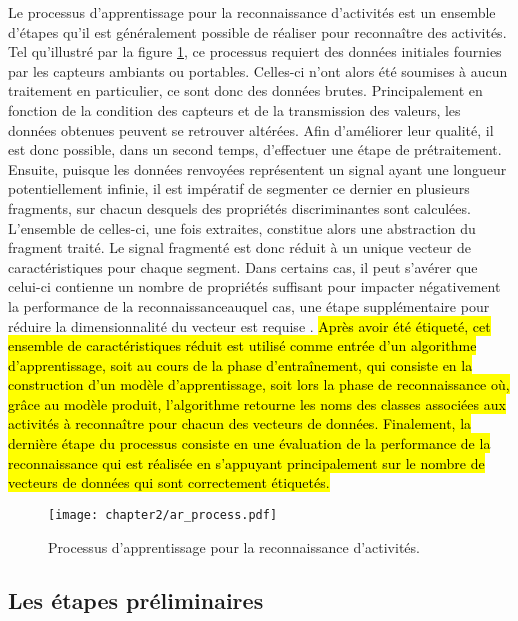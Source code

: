 Le processus d'apprentissage pour la reconnaissance d'activités est un ensemble d'étapes qu'il est généralement possible de réaliser pour reconnaître des activités. Tel qu'illustré par la figure \ref{fig:ar_process}, ce processus requiert des données initiales fournies par les capteurs ambiants ou portables. Celles-ci n'ont alors été soumises à aucun traitement en particulier, ce sont donc des données brutes. Principalement en fonction de la condition des capteurs et de la transmission des valeurs, les données obtenues peuvent se retrouver altérées. Afin d'améliorer leur qualité, il est donc possible, dans un second temps, d'effectuer une étape de prétraitement. Ensuite, puisque les données renvoyées représentent un signal ayant une longueur potentiellement infinie, il est impératif de segmenter ce dernier en plusieurs fragments, sur chacun desquels des propriétés discriminantes sont calculées. L'ensemble de celles-ci, une fois extraites, constitue alors une abstraction du fragment traité. Le signal fragmenté est donc réduit à un unique vecteur de caractéristiques pour chaque segment. Dans certains cas, il peut s'avérer que celui-ci contienne un nombre de propriétés suffisant pour impacter négativement la performance de la reconnaissance\textemdash auquel cas, une étape supplémentaire pour réduire la dimensionnalité du vecteur est requise \citep{George2012}. \hl{Après avoir été étiqueté, cet ensemble de caractéristiques réduit est utilisé comme entrée d'un algorithme d'apprentissage, soit au cours de la phase d'entraînement, qui consiste en la construction d'un modèle d'apprentissage, soit lors la phase de reconnaissance où, grâce au modèle produit, l'algorithme retourne les noms des classes associées aux activités à reconnaître pour chacun des vecteurs de données. Finalement, la dernière étape du processus consiste en une évaluation de la performance de la reconnaissance qui est réalisée en s'appuyant principalement sur le nombre de vecteurs de données qui sont correctement étiquetés.}

\begin{figure}[H]
	\centering
	\texttt{[image: chapter2/ar\_process.pdf]}
	\caption{Processus d'apprentissage pour la reconnaissance d'activités.}
	\label{fig:ar_process}
\end{figure}

\subsection{Les étapes préliminaires}
\label{sec:prel_steps}

